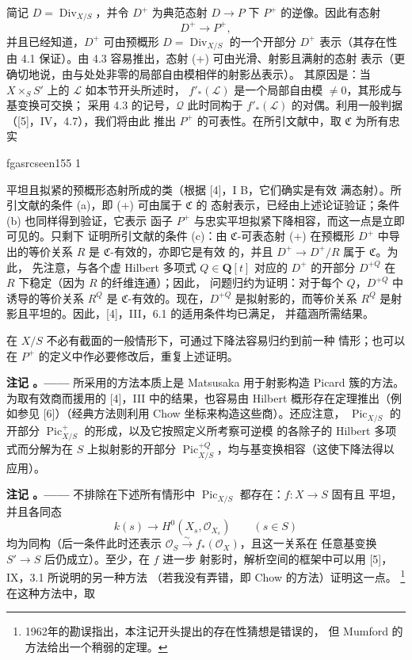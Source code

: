 \documentclass[12pt,twoside,openany]{book}
\numberwithin{equation}{section}
\newcommand{\fgaunitid}{unbound}
\newcommand{\src}[1]{%
  \phantomsection
  \hypertarget{src:\fgaunitid:#1}{}%
  \hypertarget{fga.\fgaunitid.p#1}{}%
  \ifcsname fgasrcseen#1\endcsname\else
    \expandafter\gdef\csname fgasrcseen#1\endcsname{1}%
    \hypertarget{src:#1}{}%
  \fi
  \marginpar{\raggedleft\footnotesize\sffamily #1}%
}
\theoremstyle{plain}
\theoremstyle{definition}
\theoremstyle{remark}
\newcommand{\result}[2]{%
  \par\medskip\noindent\textbf{#1%
  \if\relax\detokenize{#2}\relax\else\space#2\fi。——}\enspace
}
\begin{document}
简记 $D=\operatorname{Div}_{X/S}$，并令 $D^+$ 为典范态射
$D\longrightarrow P$ 下 $P^+$ 的逆像。因此有态射
\begin{equation}
D^+\longrightarrow P^+,
\tag{+}
\end{equation}
并且已经知道，$D^+$ 可由预概形
$D=\operatorname{Div}_{X/S}$ 的一个开部分 $D^+$ 表示（其存在性由
4.1 保证）。由 4.3 容易推出，态射 (+) 可由光滑、射影且满射的态射
表示（更确切地说，由与处处非零的局部自由模相伴的射影丛表示）。
其原因是：当 $X\times_SS'$ 上的 $\mathcal L$ 如本节开头所述时，
$f'_*(\mathcal L)$ 是一个局部自由模 $\neq0$，其形成与基变换可交换；
采用 4.3 的记号，$\mathcal Q$ 此时同构于
$f'_*(\mathcal L)$ 的对偶。利用一般判据（[5]，IV，4.7），我们将由此
推出 $P^+$ 的可表性。在所引文献中，取 $\mathfrak C$ 为所有忠实

\src{155}
平坦且拟紧的预概形态射所成的类（根据 [4]，I B，它们确实是有效
满态射）。所引文献的条件 (a)，即 (+) 可由属于 $\mathfrak C$ 的
态射表示，已经由上述论证验证；条件 (b) 也同样得到验证，它表示
函子 $P^+$ 与忠实平坦拟紧下降相容，而这一点是立即可见的。只剩下
证明所引文献的条件 (c)：由 $\mathfrak C$-可表态射 (+) 在预概形
$D^+$ 中导出的等价关系 $R$ 是 $\mathfrak C$-有效的，亦即它是有效
的，并且 $D^+\longrightarrow D^+/R$ 属于 $\mathfrak C$。为此，
先注意，与各个虚 Hilbert 多项式 $Q\in\mathbf Q[t]$ 对应的 $D^+$
的开部分 $D^{+Q}$ 在 $R$ 下稳定（因为 $R$ 的纤维连通）；因此，
问题归约为证明：对于每个 $Q$，$D^{+Q}$ 中诱导的等价关系 $R^Q$
是 $\mathfrak C$-有效的。现在，$D^{+Q}$ 是拟射影的，而等价关系
$R^Q$ 是射影且平坦的。因此，[4]，III，6.1 的适用条件均已满足，
并蕴涵所需结果。

在 $X/S$ 不必有截面的一般情形下，可通过下降法容易归约到前一种
情形；也可以在 $P^+$ 的定义中作必要修改后，重复上述证明。

\result{注记}{5.1} 所采用的方法本质上是 Matsusaka 用于射影构造
Picard 簇的方法。为取有效商而援用的 [4]，III 中的结果，也容易由
Hilbert 概形存在定理推出（例如参见 [6]）（经典方法则利用 Chow
坐标来构造这些商）。还应注意，
$\operatorname{Pic}_{X/S}$ 的开部分
$\operatorname{Pic}^{+}_{X/S}$ 的形成，以及它按照定义所考察可逆模
的各除子的 Hilbert 多项式而分解为在 $S$ 上拟射影的开部分
$\operatorname{Pic}^{+Q}_{X/S}$，均与基变换相容（这使下降法得以
应用）。

\result{注记}{5.2} 不排除在下述所有情形中
$\operatorname{Pic}_{X/S}$ 都存在：$f:X\longrightarrow S$ 固有且
平坦，并且各同态
\[
k(s)\longrightarrow H^0(X_s,\mathcal O_{X_s})\qquad(s\in S)
\]
均为同构（后一条件此时还表示
$\mathcal O_S\xrightarrow{\sim}f_*(\mathcal O_X)$，且这一关系在
任意基变换 $S'\longrightarrow S$ 后仍成立）。至少，在 $f$ 进一步
射影时，解析空间的框架中可以用 [5]，IX，3.1 所说明的另一种方法
（若我没有弄错，即 Chow 的方法）证明这一点。
\footnote{1962年的勘误指出，本注记开头提出的存在性猜想是错误的，
但 Mumford 的方法给出一个稍弱的定理。}
在这种方法中，取
\end{document}
